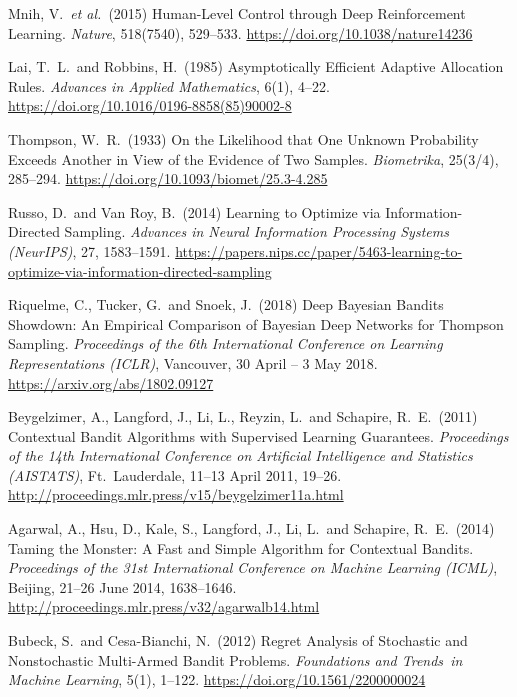 \begin{enumerate}[label={[\arabic*]},
                  leftmargin=2.8em,
                  labelwidth=2.4em,
                  labelsep=0.4em,
                  itemsep=6pt,
                  align=left]
\item Mnih, V.\ \textit{et al.}\ (2015) Human-Level Control through Deep Reinforcement Learning. \textit{Nature}, 518(7540), 529--533. \url{https://doi.org/10.1038/nature14236}

\item Lai, T.~L.\ and Robbins, H.\ (1985) Asymptotically Efficient Adaptive Allocation Rules. \textit{Advances in Applied Mathematics}, 6(1), 4--22. \url{https://doi.org/10.1016/0196-8858(85)90002-8}

\item Thompson, W.~R.\ (1933) On the Likelihood that One Unknown Probability Exceeds Another in View of the Evidence of Two Samples. \textit{Biometrika}, 25(3/4), 285--294. \url{https://doi.org/10.1093/biomet/25.3-4.285}

\item Russo, D.\ and Van Roy, B.\ (2014) Learning to Optimize via Information-Directed Sampling. \textit{Advances in Neural Information Processing Systems (NeurIPS)}, 27, 1583--1591. \url{https://papers.nips.cc/paper/5463-learning-to-optimize-via-information-directed-sampling}

\item Riquelme, C., Tucker, G.\ and Snoek, J.\ (2018) Deep Bayesian Bandits Showdown: An Empirical Comparison of Bayesian Deep Networks for Thompson Sampling. \textit{Proceedings of the 6th International Conference on Learning Representations (ICLR)}, Vancouver, 30 April -- 3 May 2018. \url{https://arxiv.org/abs/1802.09127}

\item Beygelzimer, A., Langford, J., Li, L., Reyzin, L.\ and Schapire, R.~E.\ (2011) Contextual Bandit Algorithms with Supervised Learning Guarantees. \textit{Proceedings of the 14th International Conference on Artificial Intelligence and Statistics (AISTATS)}, Ft.\ Lauderdale, 11--13 April 2011, 19--26. \url{http://proceedings.mlr.press/v15/beygelzimer11a.html}

\item Agarwal, A., Hsu, D., Kale, S., Langford, J., Li, L.\ and Schapire, R.~E.\ (2014) Taming the Monster: A Fast and Simple Algorithm for Contextual Bandits. \textit{Proceedings of the 31st International Conference on Machine Learning (ICML)}, Beijing, 21--26 June 2014, 1638--1646. \url{http://proceedings.mlr.press/v32/agarwalb14.html}

\item Bubeck, S.\ and Cesa-Bianchi, N.\ (2012) Regret Analysis of Stochastic and Nonstochastic Multi-Armed Bandit Problems. \textit{Foundations and Trends\textregistered\ in Machine Learning}, 5(1), 1--122. \url{https://doi.org/10.1561/2200000024}


\end{enumerate}
